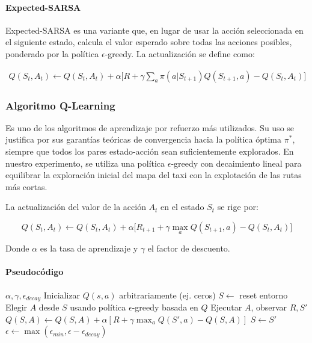 \paragraph{Expected-SARSA}

Expected-SARSA es una variante que, en lugar de usar la acción seleccionada en el 
siguiente estado, calcula el valor esperado sobre todas las acciones posibles, 
ponderado por la política $\epsilon$-greedy. La actualización se define como:

{\footnotesize
\[
\begin{aligned}
Q(S_t, A_t) \leftarrow Q(S_t, A_t) + \alpha \Big[ R + \gamma \sum_{a} \pi(a|S_{t+1}) Q(S_{t+1}, a) - Q(S_t, A_t) \Big]
\end{aligned}
\]
}
\subsubsection{Algoritmo Q-Learning}

Es uno de los algoritmos de aprendizaje por refuerzo más utilizados. Su uso se justifica por sus garantías teóricas de convergencia hacia la política óptima $\pi^*$, siempre que todos los pares estado-acción sean suficientemente explorados. En nuestro experimento, se utiliza una política $\epsilon$-greedy con decaimiento lineal para equilibrar la exploración inicial del mapa del taxi con la explotación de las rutas más cortas.

La actualización del valor de la acción $A_t$ en el estado $S_t$ se rige por:

$$
Q(S_t, A_t) \leftarrow Q(S_t, A_t) 
+ \alpha \Big[ R_{t+1} + \gamma \max_{a} Q(S_{t+1}, a) 
- Q(S_t, A_t) \Big]
$$

Donde $\alpha$ es la tasa de aprendizaje y $\gamma$ el factor de descuento.

\paragraph{Pseudocódigo}\mbox{}
\begin{algorithm}[H]
\caption{Q-Learning para Taxi-v3}
\begin{algorithmic}[1]
\small
\Require $\alpha, \gamma, \epsilon_{decay}$
\State Inicializar $Q(s, a)$ arbitrariamente (ej. ceros)
\State $S \gets$ reset entorno
\State Elegir $A$ desde $S$ usando política $\epsilon$-greedy basada en $Q$
\State Ejecutar $A$, observar $R, S'$
\State $Q(S, A) \leftarrow Q(S, A) + \alpha [R + \gamma \max_a Q(S', a) - Q(S, A)]$
\State $S \gets S'$
\EndWhile
\State $\epsilon \gets \max(\epsilon_{min}, \epsilon - \epsilon_{decay})$
\EndFor
\end{algorithmic}
\end{algorithm}

